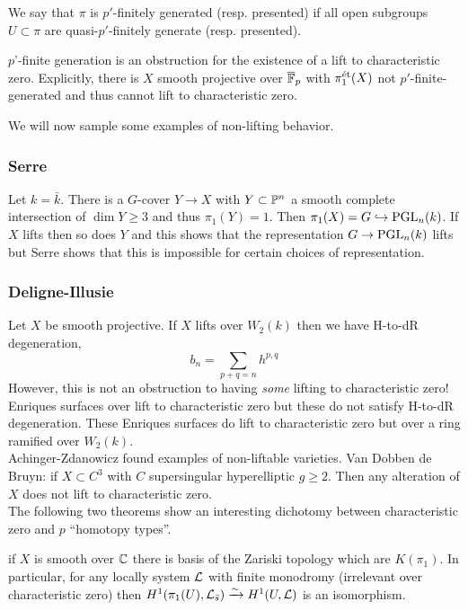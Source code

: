 \documentclass[12pt]{article}
\begin{document}
\begin{defn}
We say that $\pi$ is $p'$-finitely generated (resp. presented) if all open subgroups $U \subset \pi$ are quasi-$p'$-finitely generate (resp. presented).
\end{defn}

\begin{theorem}
$p$'-finite generation is an obstruction for the existence of a lift to characteristic zero. Explicitly, there is $X$ smooth projective over $\overline{\FF}_p$ with $\pi_1^{\et}(X)$ not $p'$-finite-generated and thus cannot lift to characteristic zero.
\end{theorem}

\noindent
We will now sample some examples of non-lifting behavior. 

\subsubsection{Serre}

Let $k = \bar{k}$. There is a $G$-cover $Y \to X$ with $Y \subset \P^n$ a smooth complete intersection of $\dim{Y} \ge 3$ and thus $\pi_1(Y) = 1$. Then $\pi_1(X) = G \embed \PGL_n(k)$. If $X$ lifts then so does $Y$ and this shows that the representation $G \to \PGL_n(k)$ lifts but Serre shows that this is impossible for certain choices of representation.

\subsubsection{Deligne-Illusie}

Let $X$ be smooth projective. If $X$ lifts over $W_2(k)$ then we have H-to-dR degeneration,
\[ b_n = \sum_{p + q = n} h^{p,q} \]
However, this is not an obstruction to having \textit{some} lifting to characteristic zero! Enriques surfaces over lift to characteristic zero but these do not satisfy H-to-dR degeneration. These Enriques surfaces do lift to characteristic zero but over a ring ramified over $W_2(k)$.
\bigskip\\
Achinger-Zdanowicz found examples of non-liftable varieties. Van Dobben de Bruyn: if $X \subset C^3$ with $C$ supersingular hyperelliptic $g \ge 2$. Then any alteration of $X$ does not lift to characteristic zero.
\bigskip\\
The following two theorems show an interesting dichotomy between characteristic zero and $p$ ``homotopy types''.  

\begin{thm}[Artin]
if $X$ is smooth over $\CC$ there is basis of the Zariski topology which are $K(\pi_1)$. In particular, for any locally system $\L$ with finite monodromy (irrelevant over characteristic zero) then $H^1(\pi_1(U), \L_{\bar{s}}) \iso H^1(U, \L)$ is an isomorphism. 
\end{thm}
\end{document}
